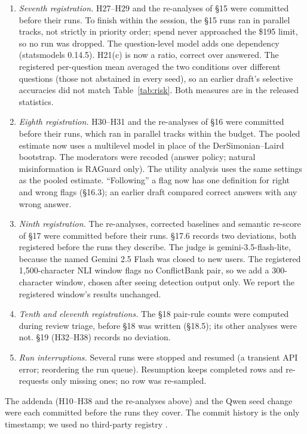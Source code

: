 \begin{enumerate}[leftmargin=*,itemsep=1pt,topsep=2pt]
(credit for naming the false side where the generator errs, charge for marking a correct passage where it is right)
were defined after seeing the H24 cells and are exploratory.
\item \emph{Seventh registration.} H27--H29 and the re-analyses of \S15 were committed before their runs. To finish
within the session, the \S15 runs ran in parallel tracks, not strictly in priority order; spend never
approached the \$195 limit, so no run was dropped. The question-level model adds one dependency (statsmodels 0.14.5).
H21(c) is now a ratio, correct over answered. The registered per-question mean averaged the two conditions
over different questions (those not abstained in every seed), so an earlier draft's selective accuracies did
not match Table~\ref{tab:risk}. Both measures are in the released statistics.
\item \emph{Eighth registration.} H30--H31 and the re-analyses of \S16 were committed before their runs, which
ran in parallel tracks within the budget. The pooled estimate now uses a multilevel model in place of the
DerSimonian--Laird bootstrap. The moderators were recoded (answer policy; natural misinformation is RAGuard only).
The utility analysis uses the same settings as the pooled estimate. ``Following'' a flag now has one definition for
right and wrong flags (\S16.3); an earlier draft compared correct answers with any wrong answer.
\item \emph{Ninth registration.} The re-analyses, corrected baselines and semantic re-score of \S17 were committed
before their runs. \S17.6 records two deviations, both registered before the runs they describe. The judge is
gemini-3.5-flash-lite, because the named Gemini 2.5 Flash was closed to new users. The registered
1,500-character NLI window flags no ConflictBank pair, so we add a 300-character window, chosen after seeing
detection output only. We report the registered window's results unchanged.
\item \emph{Tenth and eleventh registrations.} The \S18 pair-rule counts were computed during review triage, before
\S18 was written (\S18.5); its other analyses were not. \S19 (H32--H38) records no deviation.
\item \emph{Run interruptions.} Several runs were stopped and resumed (a transient API error; reordering the run
queue). Resumption keeps completed rows and re-requests only missing ones; no row was re-sampled.
\end{enumerate}
The addenda (H10--H38 and the re-analyses above) and the Qwen seed change were each committed before
the runs they cover. The commit history is the only timestamp; we used no third-party registry
\citep{vanmiltenburg2021preregistering}.

